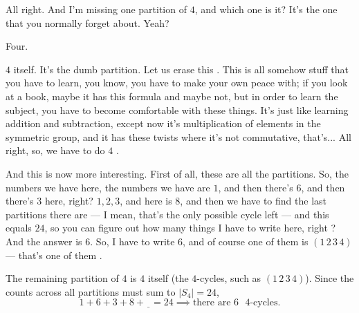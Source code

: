 \begin{speech}[00:36:21 - 00:36:33]
All right. And I'm missing one partition of $4$, and which one is it? It's the one that you normally forget about. Yeah?
\end{speech}

\begin{student}
Four.
\end{student}

\begin{speech}[00:36:34 - 00:38:01]
$4$ itself. It's the dumb partition. Let us erase this . This is all somehow stuff that you have to learn, you know, you have to make your own peace with; if you look at a book, maybe it has this formula and maybe not, but in order to learn the subject, you have to become comfortable with these things. It's just like learning addition and subtraction, except now it's multiplication of elements in the symmetric group, and it has these twists where it's not commutative, that's... All right, so, we have to do $4$ .

And this is now more interesting. First of all, these are all the partitions. So, the numbers we have here, the numbers we have are $1$, and then there's $6$, and then there's $3$ here, right? $1, 2, 3$, and here is $8$, and then we have to find the last partitions there are --- I mean, that's the only possible cycle left --- and this equals $24$, so you can figure out how many things I have to write here, right ? And the answer is $6$. So, I have to write $6$, and of course one of them is $(1\,2\,3\,4)$ --- that's one of them .
\end{speech}

\begin{content}
The remaining partition of $4$ is $4$ itself (the $4$-cycles, such as $(1\,2\,3\,4)$). Since the counts across all partitions must sum to $|S_4| = 24$,
\[
1 + 6 + 3 + 8 + \underline{\phantom{6}} = 24 \implies \text{there are } 6 \text{ $4$-cycles.}
\]
\end{content}


